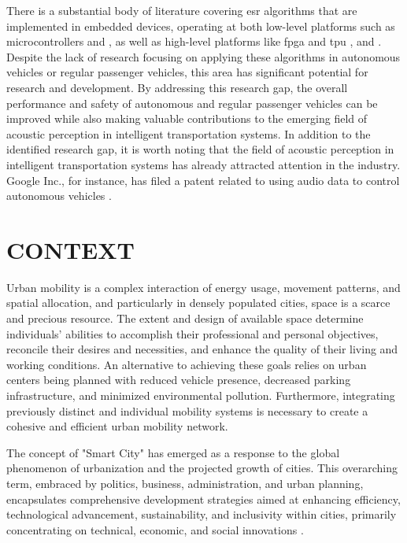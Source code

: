 There is a substantial body of literature covering \gls{esr} algorithms that are implemented in embedded devices, operating at both low-level platforms such as microcontrollers \cite{Abreha2014} and \cite{Nordby2019}, as well as high-level platforms like \gls{fpga} and \gls{tpu} \cite{Silva2019}, \cite{Vandendriessche2021} and \cite{Lhoest2021}. Despite the lack of research focusing on applying these algorithms in autonomous vehicles or regular passenger vehicles, this area has significant potential for research and development. By addressing this research gap, the overall performance and safety of autonomous and regular passenger vehicles can be improved while also making valuable contributions to the emerging field of acoustic perception in intelligent transportation systems. In addition to the identified research gap, it is worth noting that the field of acoustic perception in intelligent transportation systems has already attracted attention in the industry. Google Inc., for instance, has filed a patent related to using audio data to control autonomous vehicles \cite{Ferguson2014}.


\section{CONTEXT}
\label{sec:introduction_context}

Urban mobility is a complex interaction of energy usage, movement patterns, and spatial allocation, and particularly in densely populated cities, space is a scarce and precious resource. The extent and design of available space determine individuals' abilities to accomplish their professional and personal objectives, reconcile their desires and necessities, and enhance the quality of their living and working conditions. An alternative to achieving these goals relies on urban centers being planned with reduced vehicle presence, decreased parking infrastructure, and minimized environmental pollution. Furthermore, integrating previously distinct and individual mobility systems is necessary to create a cohesive and efficient urban mobility network.

The concept of "Smart City" has emerged as a response to the global phenomenon of urbanization and the projected growth of cities. This overarching term, embraced by politics, business, administration, and urban planning, encapsulates comprehensive development strategies aimed at enhancing efficiency, technological advancement, sustainability, and inclusivity within cities, primarily concentrating on technical, economic, and social innovations \cite{EDAG2020}.

